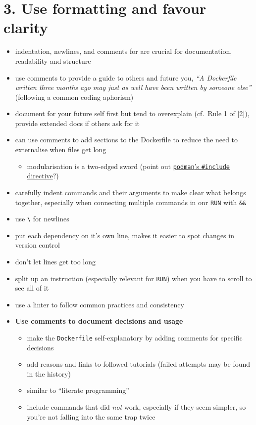 \documentclass[10pt,letterpaper]{article}
\providecommand{\tightlist}{%
  \setlength{\itemsep}{0pt}\setlength{\parskip}{0pt}}
\begin{document}
\hypertarget{use-formatting-and-favour-clarity}{%
\section{3. Use formatting and favour
clarity}\label{use-formatting-and-favour-clarity}}

\begin{itemize}
\tightlist
\item
  indentation, newlines, and comments for are crucial for documentation,
  readability and structure
\item
  use comments to provide a guide to others and future you, \emph{``A
  Dockerfile written three months ago may just as well have been written
  by someone else''} (following a common coding aphorism)
\item
  document for your future self first but tend to overexplain (cf.~Rule
  1 of {[}2{]}), provide extended docs if others ask for it
\item
  can use comments to add sections to the Dockerfile to reduce the need
  to externalise when files get long

  \begin{itemize}
  \tightlist
  \item
    modularisation is a two-edged sword (point out
    \href{https://www.mankier.com/1/podman-build}{\texttt{podman}'s
    \texttt{\#include} directive}?)
  \end{itemize}
\item
  carefully indent commands and their arguments to make clear what
  belongs together, especially when connecting multiple commands in onr
  \texttt{RUN} with \texttt{\&\&}
\item
  use \texttt{\textbackslash{}} for newlines
\item
  put each dependency on it's own line, makes it easier to spot changes
  in version control
\item
  don't let lines get too long
\item
  split up an instruction (especially relevant for \texttt{RUN}) when
  you have to scroll to see all of it
\item
  use a linter to follow common practices and consistency
\item
  \textbf{Use comments to document decisions and usage}

  \begin{itemize}
  \tightlist
  \item
    make the \texttt{Dockerfile} self-explanatory by adding comments for
    specific decisions
  \item
    add reasons and links to followed tutorials (failed attempts may be
    found in the history)
  \item
    similar to ``literate programming''
  \item
    include commands that did \emph{not} work, especially if they seem
    simpler, so you're not falling into the same trap twice
  \end{itemize}
\end{itemize}
\end{document}
